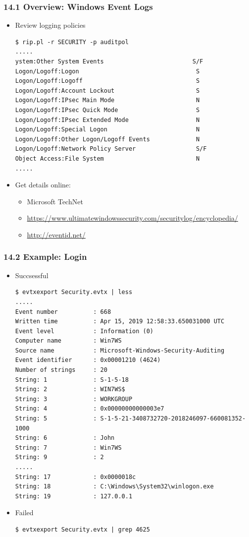 \begin{frame}[fragile]
  \frametitle{14.1 Overview: Windows Event Logs}
    \begin{itemize}
        \item Review logging policies
  \begin{lstlisting}[basicstyle=\tiny]
$ rip.pl -r SECURITY -p auditpol
.....
ystem:Other System Events                         S/F  
Logon/Logoff:Logon                                 S    
Logon/Logoff:Logoff                                S    
Logon/Logoff:Account Lockout                       S    
Logon/Logoff:IPsec Main Mode                       N    
Logon/Logoff:IPsec Quick Mode                      S    
Logon/Logoff:IPsec Extended Mode                   N    
Logon/Logoff:Special Logon                         N    
Logon/Logoff:Other Logon/Logoff Events             N    
Logon/Logoff:Network Policy Server                 S/F  
Object Access:File System                          N    
.....
  \end{lstlisting}
        \item Get details online:
            \begin{itemize}
                \item Microsoft TechNet
		\item \url{https://www.ultimatewindowssecurity.com/securitylog/encyclopedia/}
		\item \url{http://eventid.net/}
            \end{itemize}
    \end{itemize}
\end{frame}


\begin{frame}[fragile]
  \frametitle{14.2 Example: Login}
    \begin{itemize}
        \item Succsessful
  \begin{lstlisting}[basicstyle=\tiny]
$ evtxexport Security.evtx | less
.....
Event number          : 668
Written time          : Apr 15, 2019 12:58:33.650031000 UTC
Event level           : Information (0)
Computer name         : Win7WS
Source name           : Microsoft-Windows-Security-Auditing
Event identifier      : 0x00001210 (4624)
Number of strings     : 20
String: 1             : S-1-5-18
String: 2             : WIN7WS$
String: 3             : WORKGROUP
String: 4             : 0x00000000000003e7
String: 5             : S-1-5-21-3408732720-2018246097-660081352-1000
String: 6             : John
String: 7             : Win7WS
String: 9             : 2
.....
String: 17            : 0x0000018c
String: 18            : C:\Windows\System32\winlogon.exe
String: 19            : 127.0.0.1
  \end{lstlisting}
        \item Failed
  \begin{lstlisting}[basicstyle=\tiny]
$ evtxexport Security.evtx | grep 4625
  \end{lstlisting}
    \end{itemize}
\end{frame}


